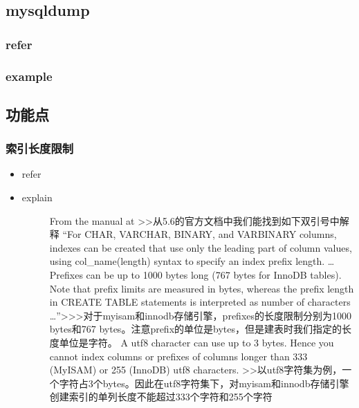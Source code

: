 \documentclass[a4paper,10pt,english]{sphinxmanual}
\begin{document}
\subsection{mysqldump}
\label{\detokenize{program/mysql:mysqldump}}

\subsubsection{refer}
\label{\detokenize{program/mysql:refer}}\begin{quote}

\end{quote}


\subsubsection{example}
\label{\detokenize{program/mysql:example}}

\subsection{功能点}
\label{\detokenize{program/mysql:id1}}

\subsubsection{索引长度限制}
\label{\detokenize{program/mysql:id2}}\begin{itemize}
\item {} \begin{description}
\item[{refer}] \leavevmode
{}

\end{description}

\item {} \begin{description}
\item[{explain}] \leavevmode
From the manual at  \textgreater{}\textgreater{}从5.6的官方文档中我们能找到如下双引号中解释
“For CHAR, VARCHAR, BINARY, and VARBINARY columns, indexes can be created that use only the leading part of column values, using col\_name(length) syntax to specify an index prefix length.
…
Prefixes can be up to 1000 bytes long (767 bytes for InnoDB tables). Note that prefix limits are measured in bytes, whereas the prefix length in CREATE TABLE statements is interpreted as number of characters …”\textgreater{}\textgreater{}\textgreater{}对于myisam和innodb存储引擎，prefixes的长度限制分别为1000 bytes和767 bytes。注意prefix的单位是bytes，但是建表时我们指定的长度单位是字符。
A utf8 character can use up to 3 bytes. Hence you cannot index columns or prefixes of columns longer than 333 (MyISAM) or 255 (InnoDB) utf8 characters.  \textgreater{}\textgreater{}以utf8字符集为例，一个字符占3个bytes。因此在utf8字符集下，对myisam和innodb存储引擎创建索引的单列长度不能超过333个字符和255个字符

\end{description}

\end{itemize}
\end{document}

